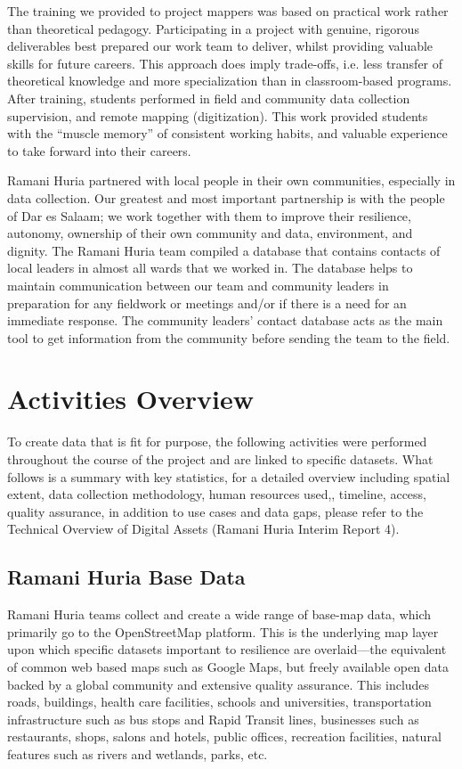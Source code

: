 \documentclass[a4paper,12pt,twoside]{article}
\begin{document}
The training we provided to project mappers was based on practical work rather than theoretical pedagogy. Participating in a project with genuine, rigorous deliverables best prepared our work team to deliver, whilst providing valuable skills for future careers. This approach does imply trade-offs, i.e. less transfer of theoretical knowledge and more specialization than in classroom-based programs. After training, students performed in field and community data collection supervision, and remote mapping (digitization). This work provided students with the “muscle memory” of consistent working habits, and valuable experience to take forward into their careers.

Ramani Huria partnered with local people in their own communities, especially in data collection. Our greatest and most important partnership is with the people of Dar es Salaam; we work together with them to improve their resilience, autonomy, ownership of their own community and data, environment, and dignity. The Ramani Huria team compiled a database that contains contacts of local leaders in almost all wards that we worked in. The database helps to maintain communication between our team and community leaders in preparation for any fieldwork or meetings and/or if there is a need for an immediate response. The community leaders’ contact database acts as the main tool to get information from the community before sending the team to the field.

\section{Activities Overview}

To create data that is fit for purpose, the following activities were performed throughout the course of the project and are linked to specific datasets. What follows is a summary with key statistics, for a detailed overview including spatial extent, data collection methodology, human resources used,, timeline, access, quality assurance, in addition to use cases and data gaps, please refer to the Technical Overview of Digital Assets (Ramani Huria Interim Report 4). 

\subsection{Ramani Huria Base Data}
Ramani Huria teams collect and create a wide range of base-map data, which primarily go to the OpenStreetMap platform. This is the underlying map layer upon which specific datasets important to resilience are overlaid—the equivalent of common web based maps such as Google Maps, but freely available open data backed by a global community and extensive quality assurance. This includes roads, buildings, health care facilities, schools and universities, transportation infrastructure such as bus stops and Rapid Transit lines, businesses such as restaurants, shops, salons and hotels, public offices, recreation facilities, natural features such as rivers and wetlands, parks, etc. 
\end{document}
